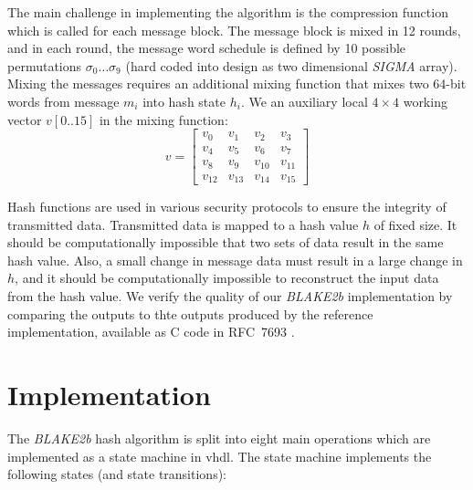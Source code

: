 \documentclass[%
	a4paper,
]
{article}
\begin{document}
The main challenge in implementing the algorithm is the compression function
which is called for each message block.
%
The message block is mixed in 12 rounds, and in each round, the message word
schedule is defined by 10 possible permutations $\sigma_0\dots\sigma_9$ (hard
coded into design as two dimensional \emph{SIGMA} array).
%
Mixing the messages requires an additional mixing function that mixes two
64-bit words from message $m_i$ into hash state $h_i$. We an auxiliary
local $4\times{}4$ working vector $v[0..15]$ in the  mixing function:
\[
   v=
  \left[ {\begin{array}{cccc}
   v_0 & v_1 &v_2 & v_3 \\
   v_4 & v_5 &v_6 & v_7\\
   v_8 & v_9 &v_{10} & v_{11}\\
   v_{12} & v_{13} &v_{14} & v_{15}
  \end{array} } \right]
\]
	    
Hash functions are used in various security protocols to ensure the integrity
of transmitted data. Transmitted data is mapped to a hash value $h$ of fixed
size. It should be computationally impossible that two sets of data
result in the same hash value. Also, a small change in message data must
result in a large change in $h$, and it should be computationally impossible to
reconstruct the input data from the hash value.
%
We verify the quality of our \emph{BLAKE2b} implementation by comparing the
outputs to thte outputs produced by the reference implementation,
available as C code in RFC~7693 \autocite[16-26]{rfc7693}.
%
%
\section{Implementation}
\label{sec:implementation}

The \emph{BLAKE2b} hash algorithm is split into eight main operations which
are implemented as a state machine in \gls{vhdl}. The state machine implements
the following states (and state transitions):
\end{document}
